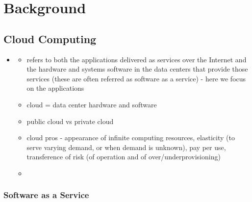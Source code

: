 \chapter{Background} \label{background}


\section{Cloud Computing}

\begin{itemize}
	\item \cite{AboveTheClouds}
	\begin{itemize}
		\item refers to both the applications delivered as services over the Internet and the hardware and systems software in the data centers that provide those services (these are often referred as software as a service) - here we focus on the applications
		\item cloud = data center hardware and software
		\item public cloud vs private cloud
		\item cloud pros - appearance of infinite computing resources, elasticity (to serve varying demand, or when demand is unknown), pay per use, transference of risk (of operation and of over/underprovisioning)
		\item 
	\end{itemize}
\end{itemize}

\subsection{Software as a Service}

